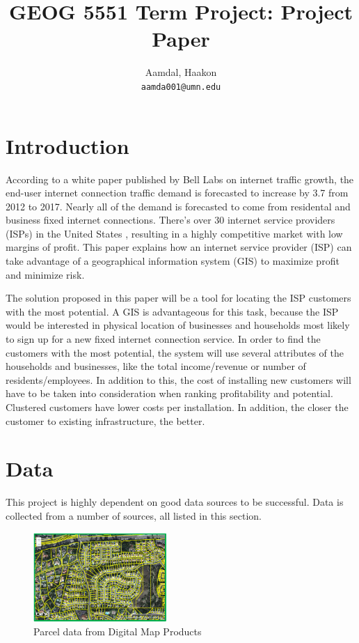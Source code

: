 \documentclass[twocolumn]{article}
\title{
    GEOG 5551 Term Project: Project Paper
}
\author{
    Aamdal, Haakon\\
    \texttt{aamda001@umn.edu}
}
\begin{document}
\maketitle

\section{Introduction}
\label{sec:Introduction}
According to a white paper published by Bell Labs \cite{Bell_Labs2013-st} on internet traffic growth, the end-user internet connection traffic demand is forecasted to increase by 3.7 from 2012 to 2017. Nearly all of the demand is forecasted to come from residental and business fixed internet connections. There's over 30 internet service providers (ISPs) in the United States \cite{noauthor_undated-uf}, resulting in a highly competitive market with low margins of profit. This paper explains how an internet service provider (ISP) can take advantage of a geographical information system (GIS) to maximize profit and minimize risk.

The solution proposed in this paper will be a tool for locating the ISP customers with the most potential. A GIS is advantageous for this task, because the ISP would be interested in physical location of businesses and households most likely to sign up for a new fixed internet connection service. In order to find the customers with the most potential, the system will use several attributes of the households and businesses, like the total income/revenue or number of residents/employees. In addition to this, the cost of installing new customers will have to be taken into consideration when ranking profitability and potential. Clustered customers have lower costs per installation. In addition, the closer the customer to existing infrastructure, the better.

\section{Data}
\label{sec:Data}
This project is highly dependent on good data sources to be successful. Data is collected from a number of sources, all listed in this section.

\begin{figure}
  \centering
  \includegraphics[width=0.45\textwidth]{img/parcel.png}
  \caption{Parcel data from Digital Map Products}
  \label{fig:parcel}

\end{figure}
\end{document}

